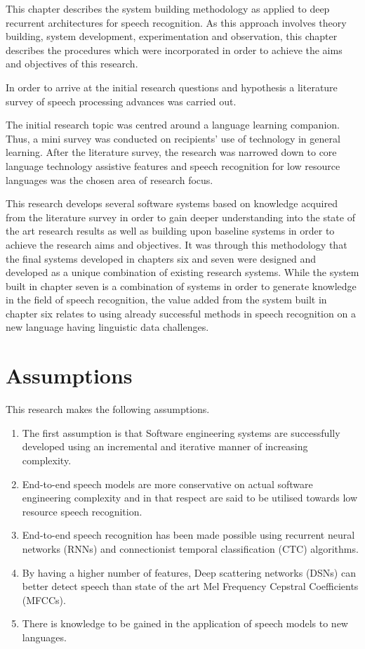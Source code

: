 This chapter describes the system building methodology  \citep{nunamaker1990systems} as applied to deep recurrent architectures for speech recognition.  As this approach involves theory building, system development, experimentation and observation, this chapter describes the procedures which were incorporated in order to achieve the aims and objectives of this research.

In order to arrive at the initial research questions and hypothesis a literature survey  of speech processing advances was carried out.  

The initial research topic was centred around a language learning companion.  Thus, a mini survey was conducted on recipients' use of technology in general learning.  After the literature survey, the research was narrowed down to core language technology assistive features and speech recognition for low resource languages was the chosen area of research focus.

This research develops several software systems based on knowledge acquired from the literature survey in order to gain deeper understanding into the state of the art research results as well as building upon baseline systems in order to achieve the research aims and objectives.  It was through this methodology that the final systems developed in chapters six and seven were designed and developed as a unique combination of existing research systems.  While the system built in chapter seven is a combination of systems in order to generate knowledge in the field of speech recognition, the value added from the system built in chapter six relates to using already successful methods in speech recognition on a new language having linguistic data challenges. 

\section{Assumptions}
This research makes the following assumptions.
\begin{enumerate}
    \item The first assumption is that Software engineering systems are successfully developed using an incremental and iterative manner of increasing complexity.
    \item End-to-end speech models are more conservative on actual software engineering complexity and in that respect are said to be utilised towards low resource speech recognition.
    \item End-to-end speech recognition has been made possible using recurrent neural networks (RNNs) and connectionist temporal classification (CTC) algorithms.
    \item By having a higher number of features, Deep scattering networks (DSNs) can better detect speech than state of the art Mel Frequency Cepstral Coefficients (MFCCs).
    \item There is knowledge to be gained in the application of speech models to new languages.
\end{enumerate}

